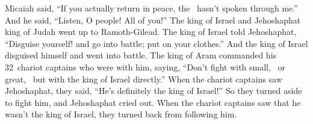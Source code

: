 \begin{inparaenum}
   Micaiah said, ``If you actually return in peace, the \lord\ hasn't spoken through me.'' And he said, ``Listen, O people! All of you!''%
   The king of Israel and Jehoshaphat king of Judah went up to Ramoth-Gilead.%
   The king of Israel told Jehoshaphat, ``Disguise yourself! and go into battle; put on your clothes.'' And the king of Israel disguised himself and went into battle.%
   The king of Aram commanded his 32~chariot captains who were with him, saying, ``Don't fight with small,\
  or great,\
  but with the king of Israel directly.''%
  \verse{22:32} When the chariot captains saw Jehoshaphat, they said, ``He's definitely the king of Israel!'' So they turned aside to fight him, and Jehoshaphat cried out.%
  \verse{22:33} When the chariot captains saw that he wasn't the king of Israel, they turned back from following him.%
  

\end{inparaenum}
